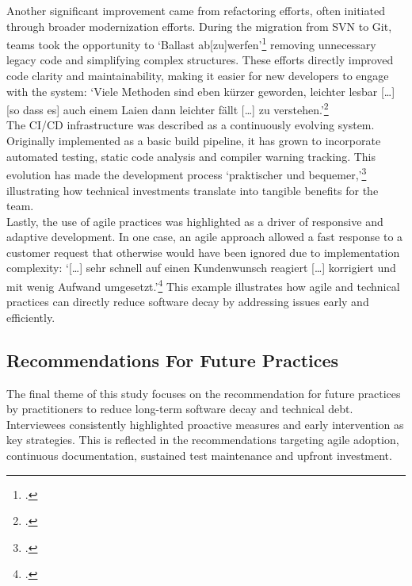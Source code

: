 Another significant improvement came from refactoring efforts, often initiated through broader modernization efforts. During the migration from SVN to Git, teams took the opportunity to `Ballast ab[zu]werfen'\footcite{interview3} removing unnecessary legacy code and simplifying complex structures. These efforts directly improved code clarity and maintainability,
making it easier for new developers to engage with the system: `Viele Methoden sind eben kürzer geworden, leichter lesbar [\ldots] [so dass es] auch einem Laien dann leichter fällt [\ldots] zu verstehen.'\footcite{interview2}\\

The CI/CD infrastructure was described as a continuously evolving system. Originally implemented as a basic build pipeline, it has grown to incorporate automated testing, static code analysis and compiler warning tracking. This evolution has made the development process `praktischer und bequemer,'\footcite{interview2} illustrating how technical
investments translate into tangible benefits for the team.\\

Lastly, the use of agile practices was highlighted as a driver of responsive and adaptive development. In one case, an agile approach allowed a fast response to a customer request that otherwise would have been ignored due to implementation complexity: `[\ldots] sehr schnell auf einen Kundenwunsch reagiert [\ldots] korrigiert und mit wenig Aufwand umgesetzt.'\footcite{interview3}
This example illustrates how agile and technical practices can directly reduce software decay by addressing issues early and efficiently.\\

\subsection{Recommendations For Future Practices}
The final theme of this study focuses on the recommendation for future practices by practitioners to reduce long-term software decay and technical debt. Interviewees consistently highlighted proactive measures and early intervention as key strategies. This is reflected in the recommendations targeting agile adoption, continuous documentation, sustained test maintenance and upfront investment.

